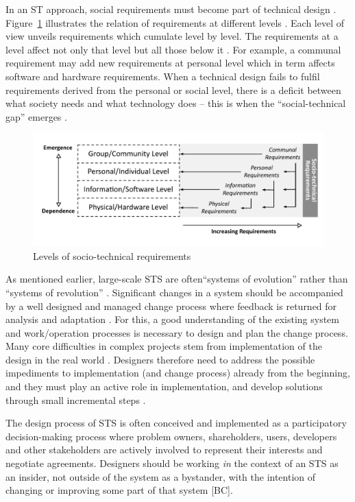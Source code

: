 % 
%
In an ST approach, social requirements must become part of technical design \cite{Whitworth2014}. Figure~\ref{fig:sts_requirements} illustrates the relation of requirements at different levels \cite{Whitworth2009a}. Each level of view unveils requirements which cumulate level by level. The requirements at a level affect not only that level but all those below it \cite{Whitworth2009a}. For example, a communal requirement may add new requirements at personal level which in term affects software and hardware requirements. When a technical design fails to fulfil requirements derived from the personal or social level, there is a deficit  between  what  society  needs  and  what technology does -- this is when the ``social-technical  gap''  emerges \cite{Whitworth2014}. 
\begin{figure}[b!]
\centering
\includegraphics[width=.8\linewidth]{img/sts_requirements.pdf}
\caption{Levels of socio-technical requirements \cite{Whitworth2009a}}
\label{fig:sts_requirements} 
\end{figure}

As mentioned earlier, large-scale STS are often``systems of evolution'' rather than ``systems of revolution'' \cite{Baxter2011,Norman2015}. Significant changes in a system should be accompanied by a well designed and managed change process where feedback is returned for analysis and adaptation \cite{Baxter2011}. For this, a good understanding of the existing system and work/operation processes is necessary to design and plan the change process. Many core difficulties in complex projects stem from implementation of the design in the real world \cite{Norman2015}. Designers therefore need to address the possible impediments to implementation (and change process) already from the beginning, and they must play an active role in implementation, and develop solutions through small incremental steps \cite{Norman2015}.

 The design process of STS is often conceived and implemented as a participatory decision-making process where problem owners, shareholders, users, developers and other stakeholders are actively involved to represent their interests and negotiate agreements. 
Designers should be working \textit{in} the context of an STS as an insider, not outside of the system as a bystander, with the intention of changing or improving some part of that system [BC]. 

